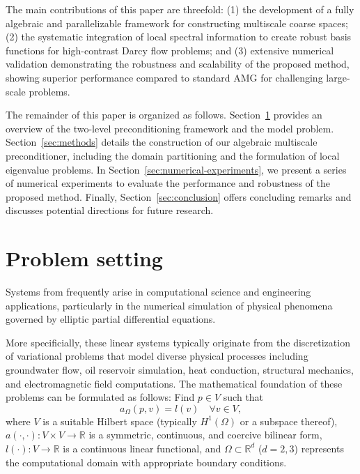 \documentclass[preprint,12pt]{elsarticle}
\begin{document}
  The main contributions of this paper are threefold: (1) the development of a
  fully algebraic and parallelizable framework for constructing multiscale
  coarse spaces; (2) the systematic integration of local spectral information to
  create robust basis functions for high-contrast Darcy flow problems; and (3)
  extensive numerical validation demonstrating the robustness and scalability of
  the proposed method, showing superior performance compared to standard AMG for
  challenging large-scale problems.

  The remainder of this paper is organized as follows. Section~\ref{sec:model-problem}
  provides an overview of the two-level preconditioning framework and the model
  problem. Section~\ref{sec:methods} details the construction of our algebraic
  multiscale preconditioner, including the domain partitioning and the
  formulation of local eigenvalue problems. In Section~\ref{sec:numerical-experiments},
  we present a series of numerical experiments to evaluate the performance and
  robustness of the proposed method. Finally, Section~\ref{sec:conclusion}
  offers concluding remarks and discusses potential directions for future
  research.

  \section{Problem setting}
  \label{sec:model-problem} Systems from  frequently arise
  in computational science and engineering applications, particularly in the numerical
  simulation of physical phenomena governed by elliptic partial differential equations.

  More specificially, these linear systems typically originate from the
  discretization of variational problems that model diverse physical processes
  including groundwater flow, oil reservoir simulation, heat conduction, structural
  mechanics, and electromagnetic field computations. The mathematical foundation
  of these problems can be formulated as follows: Find $p \in V$ such that
  \begin{equation}
    \label{eq:variational}a_{\Omega}(p, v) = l(v) \quad \forall v \in V,
  \end{equation}
  where $V$ is a suitable Hilbert space (typically $H^{1}(\Omega)$ or a subspace
  thereof), $a(\cdot, \cdot): V \times V \to \mathbb{R}$ is a symmetric,
  continuous, and coercive bilinear form, $l(\cdot): V \to \mathbb{R}$ is a
  continuous linear functional, and $\Omega \subset \mathbb{R}^{d}$ ($d=2,3$) represents
  the computational domain with appropriate boundary conditions.
\end{document}
